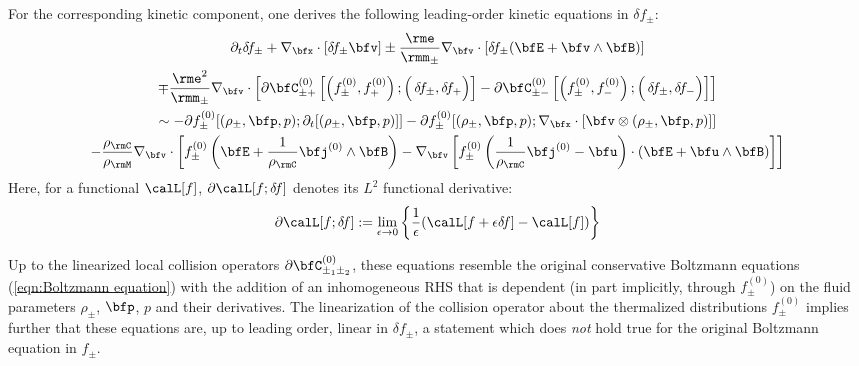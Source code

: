     \shortline

    For the corresponding kinetic component, one derives the following leading-order kinetic equations in $\delta\!f_{\pm}$:
    \begin{multline}\label{eqn:linearized Boltzmann equation}
        \partial_{t}\delta\!f_{\pm} + \nabla_{\bfx}\cdot[\delta\!f_{\pm}\bfv] \pm \frac{\rme}{\rmm_{\pm}}\nabla_{\bfv}\cdot[\delta\!f_{\pm}(\bfE + \bfv\wedge\bfB)]  \\
        \mp \frac{\rme^{2}}{\rmm_{\pm}}\nabla_{\bfv}\cdot\left[\partial\bfC_{\pm+}^{(0)}\left[\left(f_{\pm}^{(0)}, f_{+}^{(0)}\right); \left({\color{white} f_{+}^{(0)}}\!\!\!\!\!\!\!\!\!\delta\!f_{\pm}, \delta\!f_{+}\right)\right] - \partial\bfC_{\pm-}^{(0)}\left[\left(f_{\pm}^{(0)}, f_{-}^{(0)}\right); \left({\color{white} f_{+}^{(0)}}\!\!\!\!\!\!\!\!\!\delta\!f_{\pm}, \delta\!f_{-}\right)\right]\right]  \\
        \sim  - \partial f_{\pm}^{(0)}[(\rho_{\pm}, \bfp, p); \partial_{t}[(\rho_{\pm}, \bfp, p)]] - \partial f_{\pm}^{(0)}[(\rho_{\pm}, \bfp, p); \nabla_{\bfx}\cdot[\bfv\otimes(\rho_{\pm}, \bfp, p)]]  \\
        - \frac{\rho_{\rmC}}{\rho_{\rmM}}\nabla_{\bfv}\cdot\left[f_{\pm}^{(0)}\left(\bfE + \frac{1}{\rho_{\rmC}}\bfj^{(0)}\wedge\bfB\right) - \nabla_{\bfv}\left[f_{\pm}^{(0)}\left(\frac{1}{\rho_{\rmC}}\bfj^{(0)} - \bfu\right)\cdot\left(\bfE + \bfu\wedge\bfB\right)\right]\right]
    \end{multline}
    Here, for a functional $\calL[f]$, $\partial\calL[f; \delta\!f]$ denotes its $L^{2}$ functional derivative:
    \begin{equation}
        \partial\calL[f; \delta\!f]  :=  \lim_{\epsilon \rightarrow 0}\left\{\frac{1}{\epsilon}(\calL[f + \epsilon\delta\!f] - \calL[f])\right\}
    \end{equation}
    
    Up to the linearized local collision operators $\partial\bfC_{\pm_{1}\pm_{2}}^{(0)}$, these equations resemble the original conservative Boltzmann equations (\ref{eqn:Boltzmann equation}) with the addition of an inhomogeneous RHS that is dependent (in part implicitly, through $f_{\pm}^{(0)}$) on the fluid parameters $\rho_{\pm}$, $\bfp$, $p$ and their derivatives. The linearization of the collision operator about the thermalized distributions $f_{\pm}^{(0)}$ implies further that these equations are, up to leading order, linear in $\delta\!f_{\pm}$, a statement which does \emph{not} hold true for the original Boltzmann equation in $f_{\pm}$.
    
